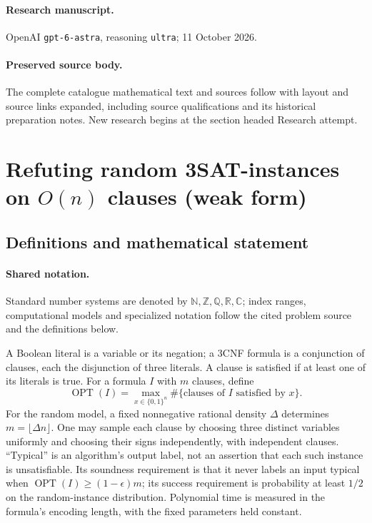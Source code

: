 \documentclass[11pt]{article}
\begin{document}
\paragraph{Research manuscript.} OpenAI \texttt{gpt-6-astra}, reasoning \texttt{ultra}; 11 October 2026.
\paragraph{Preserved source body.} The complete catalogue mathematical text and sources follow with layout and source links expanded, including source qualifications and its historical preparation notes. New research begins at the section headed Research attempt.

\section{Refuting random 3SAT-instances on $O(n)$ clauses (weak form)}\label{statement}

\subsection{Definitions and mathematical statement}

\paragraph{Shared notation.}Standard number systems are denoted by $\mathbb N,\mathbb Z,\mathbb Q,\mathbb R,\mathbb C$; index ranges, computational models and specialized notation follow the cited problem source and the definitions below.


A Boolean literal is a variable or its negation; a 3CNF formula is a conjunction of clauses, each the disjunction of three literals. A clause is satisfied if at least one of its literals is true. For a formula $I$ with $m$ clauses, define
\[
 \operatorname{OPT}(I)=\max_{x\in\{0,1\}^n}\#\{\text{clauses of }I\text{ satisfied by }x\}.
\]
For the random model, a fixed nonnegative rational density $\Delta$ determines $m=\lfloor\Delta n\rfloor$. One may sample each clause by choosing three distinct variables uniformly and choosing their signs independently, with independent clauses. ``Typical'' is an algorithm's output label, not an assertion that each such instance is unsatisfiable. Its soundness requirement is that it never labels an input typical when $\operatorname{OPT}(I)\ge(1-\epsilon)m$; its success requirement is probability at least $1/2$ on the random-instance distribution. Polynomial time is measured in the formula's encoding length, with the fixed parameters held constant.
\end{document}
